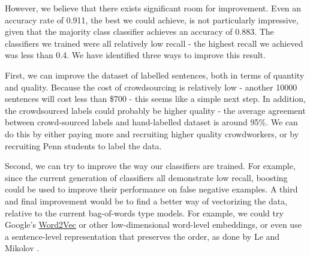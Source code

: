 \documentclass[11pt,letterpaper]{article}
\begin{document}
However, we believe that there exists significant room for improvement.  Even an accuracy rate of 0.911, the best we could achieve, is not particularly impressive, given that the majority class classifier achieves an accuracy of 0.883. The classifiers we trained were all relatively low recall - the highest recall we achieved was less than 0.4. We have identified three ways to improve this result. 

First, we can improve the dataset of labelled sentences, both in terms of quantity and quality. Because the cost of crowdsourcing is relatively low - another 10000 sentences will cost less than \$700 - this seems like a simple next step. In addition, the crowdsourced labels could probably be higher quality - the average agreement between crowd-sourced labels and hand-labelled dataset is around 95\%. We can do this by either paying more and recruiting higher quality crowdworkers, or by recruiting Penn students to label the data. 

Second, we can try to improve the way our classifiers are trained. For example, since the current generation of classifiers all demonstrate low recall, boosting could be used to improve their performance on false negative examples. A third and final improvement would be to find a better way of vectorizing the data, relative to the current bag-of-words type models. For example, we could try Google's \href{https://code.google.com/archive/p/word2vec/}{Word2Vec} or other low-dimensional word-level embeddings, or even use a sentence-level representation that preserves the order, as done by Le and Mikolov \cite{Le:14}. 




\end{document}
